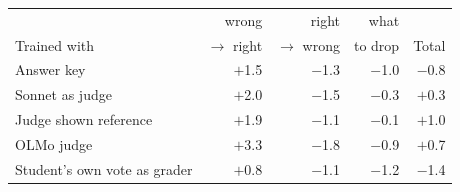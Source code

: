 \begin{tabular}{@{}lrrrr@{}}
\toprule
 & wrong & right & what & \\
Trained with & $\to$ right & $\to$ wrong & to drop & Total \\
\midrule
Answer key & $+$1.5 & $-$1.3 & $-$1.0 & $-$0.8 \\
Sonnet as judge & $+$2.0 & $-$1.5 & $-$0.3 & $+$0.3 \\
Judge shown reference & $+$1.9 & $-$1.1 & $-$0.1 & $+$1.0 \\
OLMo judge & $+$3.3 & $-$1.8 & $-$0.9 & $+$0.7 \\
\midrule
Student's own vote as grader & $+$0.8 & $-$1.1 & $-$1.2 & $-$1.4 \\
\bottomrule
\end{tabular}
